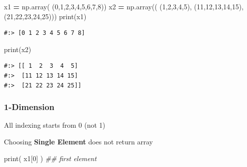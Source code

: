 \documentclass[
]{book}
\newenvironment{Shaded}{\begin{snugshade}}{\end{snugshade}}
\newcommand{\BuiltInTok}[1]{#1}
\newcommand{\CommentTok}[1]{\textcolor[rgb]{0.37,0.37,0.37}{\textit{#1}}}
\newcommand{\DecValTok}[1]{\textcolor[rgb]{0.06,0.06,0.06}{#1}}
\newcommand{\NormalTok}[1]{#1}
\newcommand{\OperatorTok}[1]{\textcolor[rgb]{0.43,0.43,0.43}{\textbf{#1}}}
\begin{document}
\begin{Shaded}
\begin{Highlighting}[]
\NormalTok{x1 }\OperatorTok{=}\NormalTok{ np.array( (}\DecValTok{0}\NormalTok{,}\DecValTok{1}\NormalTok{,}\DecValTok{2}\NormalTok{,}\DecValTok{3}\NormalTok{,}\DecValTok{4}\NormalTok{,}\DecValTok{5}\NormalTok{,}\DecValTok{6}\NormalTok{,}\DecValTok{7}\NormalTok{,}\DecValTok{8}\NormalTok{))}
\NormalTok{x2 }\OperatorTok{=}\NormalTok{ np.array(( (}\DecValTok{1}\NormalTok{,}\DecValTok{2}\NormalTok{,}\DecValTok{3}\NormalTok{,}\DecValTok{4}\NormalTok{,}\DecValTok{5}\NormalTok{), }
\NormalTok{      (}\DecValTok{11}\NormalTok{,}\DecValTok{12}\NormalTok{,}\DecValTok{13}\NormalTok{,}\DecValTok{14}\NormalTok{,}\DecValTok{15}\NormalTok{),}
\NormalTok{      (}\DecValTok{21}\NormalTok{,}\DecValTok{22}\NormalTok{,}\DecValTok{23}\NormalTok{,}\DecValTok{24}\NormalTok{,}\DecValTok{25}\NormalTok{)))}
\BuiltInTok{print}\NormalTok{(x1)}
\end{Highlighting}
\end{Shaded}

\begin{verbatim}
#:> [0 1 2 3 4 5 6 7 8]
\end{verbatim}

\begin{Shaded}
\begin{Highlighting}[]
\BuiltInTok{print}\NormalTok{(x2)}
\end{Highlighting}
\end{Shaded}

\begin{verbatim}
#:> [[ 1  2  3  4  5]
#:>  [11 12 13 14 15]
#:>  [21 22 23 24 25]]
\end{verbatim}

\hypertarget{dimension}{%
\subsubsection{1-Dimension}\label{dimension}}

All indexing starts from 0 (not 1)

Choosing \textbf{Single Element} does not return array

\begin{Shaded}
\begin{Highlighting}[]
\BuiltInTok{print}\NormalTok{( x1[}\DecValTok{0}\NormalTok{]   )  }\CommentTok{## first element}
\end{Highlighting}
\end{Shaded}
\end{document}
